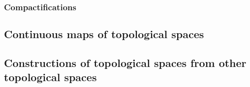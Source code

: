 

\subsubsection{Compactifications}









\subsection{Continuous maps of topological spaces}













\subsection{Constructions of topological spaces from other topological spaces}









